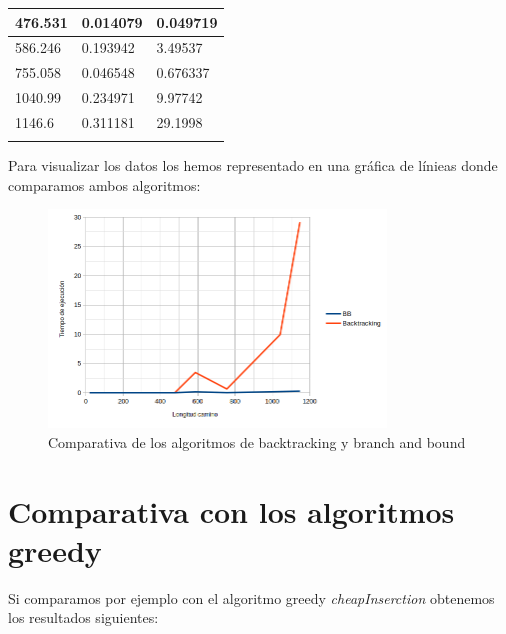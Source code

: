 \documentclass{article}
\begin{document}
\begin{table}[H]
\begin{tabular}{lll}
\multicolumn{1}{|l|}{476.531}  & \multicolumn{1}{l|}{0.014079}         & \multicolumn{1}{l|}{0.049719}     \\ \hline
\multicolumn{1}{|l|}{586.246}  & \multicolumn{1}{l|}{0.193942}         & \multicolumn{1}{l|}{3.49537}      \\ \hline
\multicolumn{1}{|l|}{755.058}  & \multicolumn{1}{l|}{0.046548}         & \multicolumn{1}{l|}{0.676337}     \\ \hline
\multicolumn{1}{|l|}{1040.99}  & \multicolumn{1}{l|}{0.234971}         & \multicolumn{1}{l|}{9.97742}      \\ \hline
\multicolumn{1}{|l|}{1146.6}   & \multicolumn{1}{l|}{0.311181}         & \multicolumn{1}{l|}{29.1998}      \\ \hline
                               &                                       &                                  
\end{tabular}
\end{table}


Para visualizar los datos los hemos representado en una gráfica de
línieas donde comparamos ambos algoritmos:

\begin{figure}[H]
  \centering
  \includegraphics[width=0.8\textwidth]{comparativa.png}
  \caption{Comparativa de los algoritmos de backtracking y branch and bound}
\end{figure}


\section{Comparativa con los algoritmos greedy}

Si comparamos por ejemplo con el algoritmo greedy
\textit{cheapInserction} obtenemos los resultados siguientes:
\end{document}
